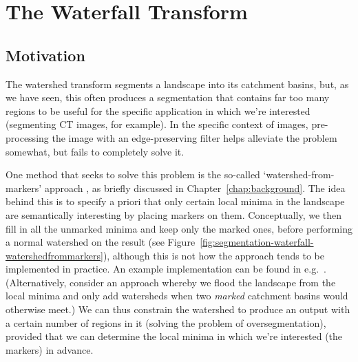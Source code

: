 
\clearpage

\section{The Waterfall Transform}
\label{sec:segmentation-waterfall}


\subsection{Motivation}


The watershed transform segments a landscape into its catchment basins, but, as we have seen, this often produces a segmentation that contains far too many regions to be useful for the specific application in which we're interested (segmenting CT images, for example). In the specific context of images, pre-processing the image with an edge-preserving filter helps alleviate the problem somewhat, but fails to completely solve it.

One method that seeks to solve this problem is the so-called `watershed-from-markers' approach \cite{meyer90}, as briefly discussed in Chapter~\ref{chap:background}. The idea behind this is to specify a priori that only certain local minima in the landscape are semantically interesting by placing markers on them. Conceptually, we then fill in all the unmarked minima and keep only the marked ones, before performing a normal watershed on the result (see Figure~\ref{fig:segmentation-waterfall-watershedfrommarkers}), although this is not how the approach tends to be implemented in practice. An example implementation can be found in e.g.~\cite{felkel01}. (Alternatively, consider an approach whereby we flood the landscape from the local minima and only add watersheds when two \emph{marked} catchment basins would otherwise meet.) We can thus constrain the watershed to produce an output with a certain number of regions in it (solving the problem of oversegmentation), provided that we can determine the local minima in which we're interested (the markers) in advance.

